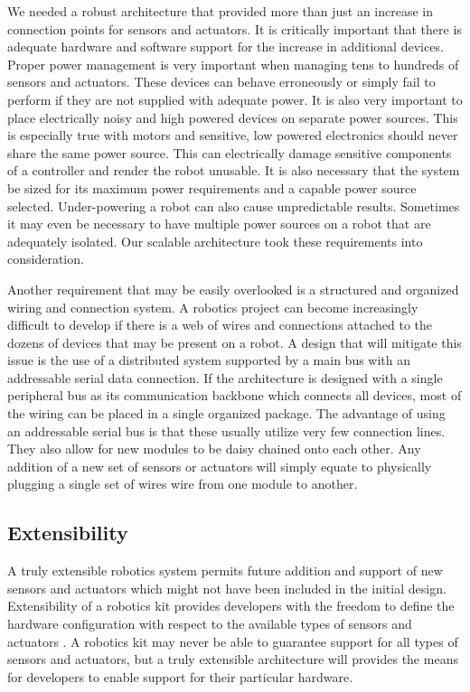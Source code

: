  We needed a robust architecture that provided more than just an increase in connection points for sensors and actuators. It is critically important that there is adequate hardware and software support for the increase in additional devices. Proper power management is very important when managing tens to hundreds of sensors and actuators. These devices can behave erroneously or simply fail to perform if they are not supplied with adequate power. It is also very important to place electrically noisy and high powered devices on separate power sources. This is especially true with motors and sensitive, low powered electronics should never share the same power source. This can electrically damage sensitive components of a controller and render the robot unusable. It is also necessary that the system be sized for its maximum power requirements and a capable power source selected. Under-powering a robot can also cause unpredictable results. Sometimes it may even be necessary to have multiple power sources on a robot that are adequately isolated. Our scalable architecture took these requirements into consideration.

Another requirement that may be easily overlooked is a structured and organized wiring and connection system. A robotics project can become increasingly difficult to develop if there is a web of wires and connections attached to the dozens of devices that may be present on a robot. A design that will mitigate this issue is the use of a distributed system supported by a main bus with an addressable serial data connection. If the architecture is designed with a single peripheral bus as its communication backbone which connects all devices, most of the wiring can be placed in a single organized package. The advantage of using an addressable serial bus is that these usually utilize very few connection lines. They also allow for new modules to be daisy chained onto each other. Any addition of a new set of sensors or actuators will simply equate to physically plugging a single set of wires wire from one module to another.




\subsection{Extensibility} %
\label{sub:extensibility}
A truly extensible robotics system permits future addition and support of new sensors and actuators which might not have been included in the initial design. Extensibility of a robotics kit provides developers with the freedom to define the hardware configuration with respect to the available types of sensors and actuators \parencite{rdk}. A robotics kit may never be able to guarantee support for all types of sensors and actuators, but a truly extensible architecture will provides the means for developers to enable support for their particular hardware. 

